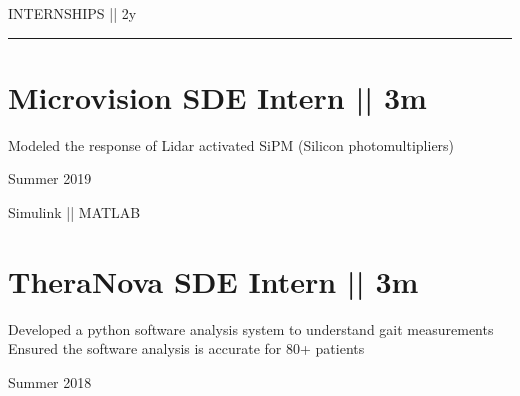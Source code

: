 \vspace{-1.4ex}
{
\hspace{-1.72in}\noindent\color{cblue}
{INTERNSHIPS  } 
{\small \color{black} || 2y}
}

\vspace{-1.6ex}
{\hspace{-1.73in}\noindent\color{dblue}\rule{6.935in}{0.4pt}} %

\vspace{-0.4ex}

\section
{\textbf{Microvision}
\newline
SDE Intern || 3m
\newline}


\vspace{-2.5ex}
\begin{detail}
\BulletItem
Modeled the response of Lidar activated SiPM (Silicon photomultipliers) 
\end{detail}

\begin{subtitle}
\vspace{-5ex}
{{Summer 2019}} 
\end{subtitle}

\vspace{-1.5ex}
{
\vspace{-0.8ex}
\color{cyan}\small
{Simulink || MATLAB} %
}

\vspace{0.8ex}
\section
{\textbf{TheraNova}
\newline
SDE Intern || 3m
}

\BulletItem
\vspace{-2.5ex}
\begin{detail}

\BulletItem
 Developed a python software analysis system to understand gait measurements
\BulletItem
 Ensured the software analysis is accurate for 80+ patients
\end{detail}

\begin{subtitle}
\vspace{-7.8ex}
{{Summer 2018}}
\end{subtitle}
\vspace{0ex}

